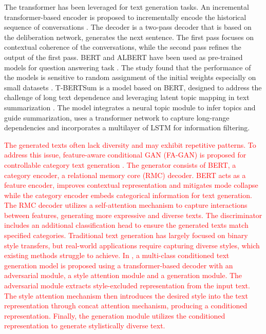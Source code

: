 \documentclass[preprint,12pt]{elsarticle}
\begin{document}
The transformer has been leveraged for text generation tasks. An incremental transformer-based encoder is proposed to incrementally encode the historical sequence of conversations \citep{li_incremental_2019}. The decoder is a two-pass decoder that is based on the deliberation network, generates the next sentence. The first pass focuses on contextual coherence of the conversations, while the second pass refines the output of the first pass. BERT and ALBERT have been used as pre-trained models for question answering task \citep{alrowili_biom-transformers_2021}. The study found that the performance of the models is sensitive to random assignment of the initial weights especially on small datasets \citep{alrowili_exploring_2022}. T-BERTSum is a model based on BERT, designed to address the challenge of long text dependence and leveraging latent topic mapping in text summarization \citep{ma_t-bertsum_2021}. The model integrates a neural topic module to infer topics and guide summarization, uses a transformer network to capture long-range dependencies and incorporates a multilayer of LSTM for information filtering. 

\textcolor{red}{The generated texts often lack diversity and may exhibit repetitive patterns. To address this issue, feature-aware conditional GAN (FA-GAN) is proposed for controllable category text generation \citep{li_feature-aware_2023}. The generator consists of BERT, a category encoder, a relational memory core (RMC) decoder. BERT acts as a feature encoder, improves contextual representation and mitigates mode collapse while the category encoder embeds categorical information for text generation. The RMC decoder utilizes a self-attention mechanism to capture interactions between features, generating more expressive and diverse texts. The discriminator includes an additional classification head to ensure the generated texts match specified categories. Traditional text generation has largely focused on binary style transfers, but real-world applications require capturing diverse styles, which existing methods struggle to achieve. In \citep{kwon_class_2024}, a multi-class conditioned text generation model is proposed using a transformer-based decoder with an adversarial module, a style attention module and a generation module. The adversarial module extracts style-excluded representation from the input text. The style attention mechanism then introduces the desired style into the text representation through concat attention mechanism, producing a conditioned representation. Finally, the generation module utilizes the conditioned representation to generate stylistically diverse text. }
\end{document}
